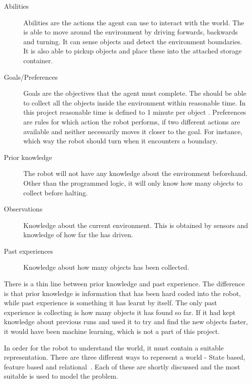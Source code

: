 \begin{description}
\item[Abilities] Abilities are the actions the agent can use to interact with the world. The \projname{} is able to move around the environment by driving forwards, backwards and turning. It can sense objects and detect the environment boundaries. It is also able to pickup objects and place these into the attached storage container.  
\item[Goals/Preferences] Goals are the objectives that the agent must complete. The \projname{} should be able to collect all the objects inside the environment within reasonable time. In this project reasonable time is defined to 1 minute per object . Preferences are rules for which action the robot performs, if two different actions are available and neither necessarily moves it closer to the goal. For instance, which way the robot should turn when it encounters a boundary.
\item[Prior knowledge] The robot will not have any knowledge about the environment beforehand. Other than the programmed logic, it will only know how many objects to collect before halting.
\item[Observations] Knowledge about the current environment. This is obtained by sensors and knowledge of how far the \projname{} has driven. 
\item[Past experiences] Knowledge about how many objects has been collected. 
\end{description}

There is a thin line between prior knowledge and past experience. The difference is that prior knowledge is information that has been hard coded into the robot, while past experience is something it has learnt by itself. The only past experience \projname{} is collecting is how many objects it has found so far. If it had kept knowledge about previous runs and used it to try and find the new objects faster, it would have been machine learning, which is not a part of this project.

In order for the robot to understand the world, it must contain a suitable representation. There are three different ways to represent a world - State based, feature based and relational~\citep{artificialintelligencebook}. Each of these are shortly discussed and the most suitable is used to model the problem. 


